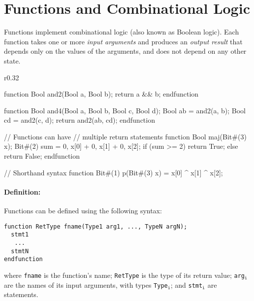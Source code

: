 \section{Functions and Combinational Logic}
\label{sec:functions}

Functions implement combinational logic (also known as Boolean logic).
Each function takes one or more \emph{input arguments} and produces an
\emph{output result} that depends only on the values of the arguments,
and does not depend on any other state.

\begin{wrapfigure}{r}{0.32\columnwidth}
\vspace{-1em}
\begin{mscode}
function Bool and2(Bool a,
                   Bool b);
  return a && b;
endfunction

function Bool and4(Bool a,
                   Bool b,
                   Bool c,
                   Bool d);
  Bool ab = and2(a, b);
  Bool cd = and2(c, d);
  return and2(ab, cd);
endfunction

// Functions can have 
// multiple return statements
function Bool maj(Bit#(3) x);
  Bit#(2) sum = {0, x[0]} +
                {0, x[1]} +
                {0, x[2]};
  if (sum >= 2) return True;
  else return False;
endfunction

// Shorthand syntax
function Bit#(1) p(Bit#(3) x)
  = x[0] ^ x[1] ^ x[2];
\end{mscode}
\vspace{-6em}
\label{lst:functions}
\end{wrapfigure}


\paragraph{Definition:}
Functions can be defined using the following syntax:
\begin{center}
\verb|function RetType fname(Type1 arg1, ..., TypeN argN);| \\
\verb|  stmt1                                             | \\
\verb|   ...                                              | \\
\verb|  stmtN                                             | \\
\verb|endfunction                                         |
\end{center}
where \verb|fname| is the function's name;
\verb|RetType| is the type of its return value;
\verb|arg|$_{\texttt{i}}$ are the names of its input arguments,
with types \verb|Type|$_{\texttt{i}}$;
and \verb|stmt|$_{\texttt{i}}$ are statements.

